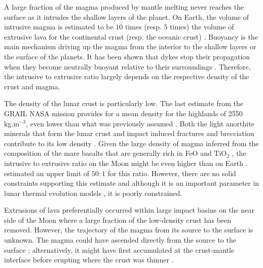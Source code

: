   A  large fraction  of the  magma  produced by  mantle melting  never
  reaches  the  surface as  it  intrudes  the  shallow layers  of  the
  planet. On Earth,  the volume of intrusive magma is  estimated to be
  $10$ times  (resp. $5$ times) the  volume of extrusive lava  for the
  continental crust  (resp.  the oceanic  crust) \citep{Crisp:1984dm}.
  Buoyancy  is  the main  mechanism  driving  up  the magma  from  the
  interior to  the shallow layers or  the surface of the  planets.  It
  has been  shown that dykes  stop their propagation when  they become
  neutrally     buoyant     relative     to     their     surroundings
  \citep{Walker:1989jq,Rivalta:2005kd,Taisne:2009va}.   Therefore, the
  intrusive  to  extrusive ratio  largely  depends  on the  respective
  density of the crust and magma.
	
  The  density of  the  lunar  crust is  particularly  low.  The  last
  estimate from the GRAIL NASA mission provides for a mean density for
  the  highlands  of  2550  kg.m$^{-3}$,  even  lower  than  what  was
  previously  assumed   \citep{Wieczorek:2013ipa}.   Both   the  light
  anorthite  minerals that  form the  lunar crust  and impact  induced
  fractures   and   brecciation   contribute  to   its   low   density
  \citep{Wilhelms:1987vb}.  Given the large  density of magma inferred
  from the composition of the mare  basalts that are generally rich in
  FeO  and   TiO$_{2}$  \citep{Wieczorek:2001jt},  the   intrusive  to
  extrusive  ratio on  the Moon  might be  even higher  than on  Earth
  \citep{ElBaz:1970kc,Wilson:1981fm,Hiesinger:2006cb,Glotch:2010ih}. \citet{Head:1992bk}
  estimated an upper  limit of $50:1$ for this  ratio.  However, there
  are no solid constraints supporting this estimate and although it is
  an   important  parameter   in   lunar   thermal  evolution   models
  \citep{Laneuville:2013gp}, it is poorly constrained.
	
  Extrusions  of  lava  preferentially occurred  within  large  impact
  basins on the  near side of the  Moon where a large  fraction of the
  low-density crust has  been removed. However, the  trajectory of the
  magma from  its source to  the surface  is unknown. The  magma could
  have   ascended   directly   from   the  source   to   the   surface
  \citep{Wieczorek:2001jt};   alternatively,  it   might  have   first
  accumulated at the crust-mantle  interface before erupting where the
  crust was thinner \citep{Wilson:1981fm}.
	
